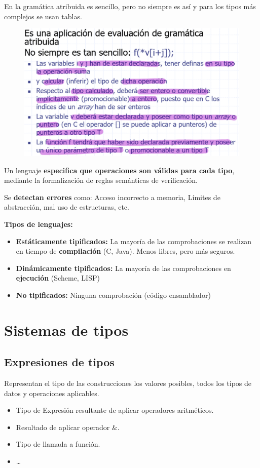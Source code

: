 \documentclass[12pt, twoside, openright]{report} %
\begin{document}
En la gramática atribuida es sencillo, pero no siempre es así y para los tipos más complejos se usan tablas.
\begin{figure}[H]
  {\includegraphics[scale=.25]{2021-05-01 02_14_46-06_resum_Tipos_2021.pdf - Foxit Reader.png}}
\end{figure}

Un lenguaje \textbf{especifica que operaciones son válidas para cada tipo}, mediante la formalización de reglas semánticas de verificación.

Se \textbf{detectan errores} como: Acceso incorrecto a memoria, Límites de abstracción, mal uso de estructuras, etc.

\textbf{Tipos de lenguajes:}
\begin{itemize}
  \item \textbf{Estáticamente tipificados:} La mayoría de las comprobaciones se realizan en tiempo de \textbf{compilación} (C, Java). Menos libres, pero más seguros.
  \item \textbf{Dinámicamente tipificados:} La mayoría de las comprobaciones en \textbf{ejecución} (Scheme, LISP)
  \item \textbf{No tipificados:} Ninguna comprobación (código ensamblador)
\end{itemize}

\section{Sistemas de tipos}
\subsection{Expresiones de tipos}
Representan el tipo de las construcciones los valores posibles, todos los tipos de datos y operaciones aplicables.
\begin{itemize}
  \item Tipo de Expresión resultante de aplicar operadores aritméticos.
  \item Resultado de aplicar operador \&.
  \item Tipo de llamada a función.
  \item …
\end{itemize}
\end{document}
